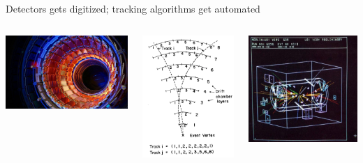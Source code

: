 \documentclass[aspectratio=169]{beamer}
\begin{document}
\begin{frame}{Detectors gets digitized; tracking algorithms get automated}
\vspace{0.25 cm}
\begin{columns}
\includegraphics[width=\linewidth]{cms-tracker.jpg}

\vspace{-4 cm}
\includegraphics[height=4 cm]{track-reconstruction.png}

\includegraphics[width=\linewidth]{megatek-2.png}


\end{columns}
\end{frame}
\end{document}

